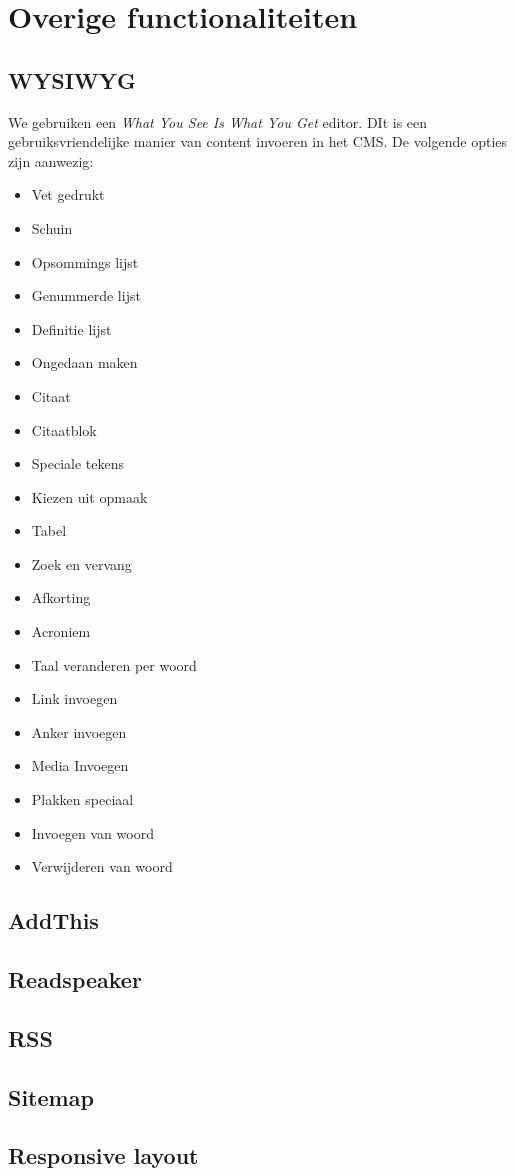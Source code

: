 
\section{Overige functionaliteiten}
\label{sec:overigefunctionaliteiten}

\subsection{WYSIWYG}
We gebruiken een \emph{What You See Is What You Get} editor. DIt is een gebruiksvriendelijke manier van content invoeren in het CMS. De volgende opties zijn aanwezig:

\begin{itemize}
  \item Vet gedrukt
  \item Schuin
  \item Opsommings lijst
  \item Genummerde lijst 
  \item Definitie lijst
  \item Ongedaan maken
  \item Citaat
  \item Citaatblok
  \item Speciale tekens
  \item Kiezen uit opmaak
  \item Tabel
  \item Zoek en vervang
  \item Afkorting
  \item Acroniem
  \item Taal veranderen per woord
  \item Link invoegen
  \item Anker invoegen
  \item Media Invoegen
  \item Plakken speciaal
  \item Invoegen van woord
  \item Verwijderen van woord
\end{itemize}

\subsection{AddThis}

\subsection{Readspeaker}

\subsection{RSS}

\subsection{Sitemap}

\subsection{Responsive layout}
